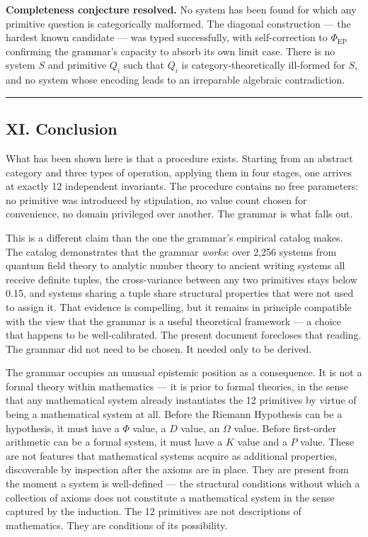 \documentclass[12pt,a4paper]{article}
\begin{document}
\textbf{Completeness conjecture resolved.} No system has been found for which any primitive question is categorically malformed. The diagonal construction --- the hardest known candidate --- was typed successfully, with self-correction to $\Phi_\text{EP}$ confirming the grammar's capacity to absorb its own limit case. There is no system $S$ and primitive $Q_i$ such that $Q_i$ is category-theoretically ill-formed for $S$, and no system whose encoding leads to an irreparable algebraic contradiction.

\begin{center}
\rule{0.5\textwidth}{0.4pt}
\end{center}

\subsection{XI. Conclusion}

What has been shown here is that a procedure exists. Starting from an abstract category and three types of operation, applying them in four stages, one arrives at exactly 12 independent invariants. The procedure contains no free parameters: no primitive was introduced by stipulation, no value count chosen for convenience, no domain privileged over another. The grammar is what falls out.

This is a different claim than the one the grammar's empirical catalog makes. The catalog demonstrates that the grammar \emph{works}: over 2,256 systems from quantum field theory to analytic number theory to ancient writing systems all receive definite tuples, the cross-variance between any two primitives stays below 0.15, and systems sharing a tuple share structural properties that were not used to assign it. That evidence is compelling, but it remains in principle compatible with the view that the grammar is a useful theoretical framework --- a choice that happens to be well-calibrated. The present document forecloses that reading. The grammar did not need to be chosen. It needed only to be derived.

The grammar occupies an unusual epistemic position as a consequence. It is not a formal theory within mathematics --- it is prior to formal theories, in the sense that any mathematical system already instantiates the 12 primitives by virtue of being a mathematical system at all. Before the Riemann Hypothesis can be a hypothesis, it must have a $\Phi$ value, a $D$ value, an $\Omega$ value. Before first-order arithmetic can be a formal system, it must have a $K$ value and a $P$ value. These are not features that mathematical systems acquire as additional properties, discoverable by inspection after the axioms are in place. They are present from the moment a system is well-defined --- the structural conditions without which a collection of axioms does not constitute a mathematical system in the sense captured by the induction. The 12 primitives are not descriptions of mathematics. They are conditions of its possibility.
\end{document}
